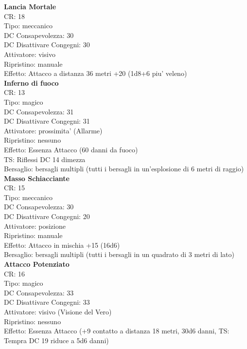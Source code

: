 \documentclass[a4paper,11pt,twoside,openany]{book}
\begin{document}
{\begin{multicols}{2}
\textbf{Lancia Mortale}\\
CR: 18 \\
Tipo: meccanico \\
DC Consapevolezza: 30 \\
DC Disattivare Congegni: 30 \\
Attivatore: visivo\\
Ripristino: manuale \\
Effetto: Attacco a distanza 36 metri +20 (1d8+6 piu' veleno)\\

\textbf{Inferno di fuoco}\\
CR: 13 \\
Tipo: magico \\
DC Consapevolezza: 31 \\
DC Disattivare Congegni: 31 \\
Attivatore: prossimita' (Allarme) \\
Ripristino: nessuno \\
Effetto: Essenza Attacco (60 danni da fuoco) \\
TS: Riflessi DC 14 dimezza \\
Bersaglio: bersagli multipli (tutti i bersagli in un’esplosione di 6 metri di raggio)\\

\textbf{Masso Schiacciante}\\
CR: 15 \\
Tipo: meccanico \\
DC Consapevolezza: 30 \\
DC Disattivare Congegni: 20 \\
Attivatore: posizione \\
Ripristino: manuale \\
Effetto: Attacco in mischia +15 (16d6) \\
Bersaglio: bersagli multipli (tutti i bersagli in un quadrato di 3 metri di lato)\\

\textbf{Attacco Potenziato}\\
CR: 16 \\
Tipo: magico \\
DC Consapevolezza: 33 \\
DC Disattivare Congegni: 33 \\
Attivatore: visivo (Visione del Vero) \\
Ripristino: nessuno \\
Effetto: Essenza Attacco (+9 contatto a distanza 18 metri, 30d6 danni, TS: Tempra DC 19 riduce a 5d6 danni)\\


\end{multicols}}
\end{document}
